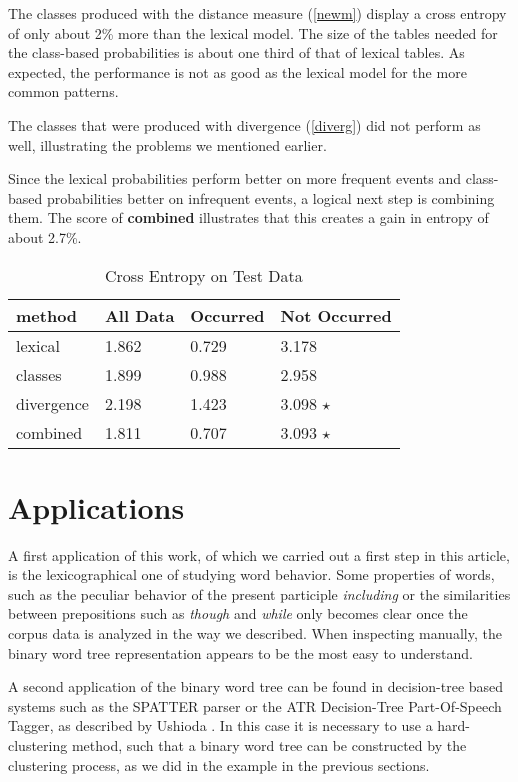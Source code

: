 The classes produced with the distance measure (\ref{newm}) display a
cross entropy of only about 2\% more than the lexical model. The size
of the tables needed for the class-based probabilities is about one
third of that of lexical tables. As expected, the performance is not
as good as the lexical model for the more common patterns.

The classes that were produced with divergence (\ref{diverg}) did not
perform as well, illustrating the problems we mentioned earlier.

Since the lexical probabilities perform better on more frequent events
and class-based probabilities better on infrequent events, a logical
next step is combining them. The score of {\bf combined} illustrates
that this creates a gain in entropy of about 2.7\%.

\begin{table}[thbc]
\begin{center}
\caption{Cross Entropy on Test Data}
\begin{tabular}{|l|l|l|l|} \hline
method & All Data & Occurred & Not Occurred \\ \hline
lexical    &  1.862    &   0.729   &   3.178   \\
classes  &  1.899    &  0.988    &  2.958  \\
divergence &  2.198   &   1.423   &   3.098 $\star$  \\
combined   & 1.811 & 0.707   &   3.093 $\star$ \\ \hline
\end{tabular}
\label{mainres}
\end{center}
\end{table}


\section{Applications}

A first application of this work, of which we carried out a first step in this
article, is the lexicographical one of studying word behavior. Some properties
of words, such as the peculiar behavior of the present participle {\em including} or the
similarities between prepositions such as {\em though} and {\em while} only becomes
clear once the corpus data is analyzed in the way we described. When inspecting
manually, the binary word tree representation appears to be the most easy to
understand.

A second application of the binary word tree can be found in decision-tree based
systems such as the SPATTER parser \cite{magerman:acl} or the ATR Decision-Tree
Part-Of-Speech Tagger, as described by Ushioda \cite{ushioda96}. In this case it
is necessary to use a hard-clustering method, such that a binary word tree can
be constructed by the clustering process, as we did in the example in the
previous sections. 

